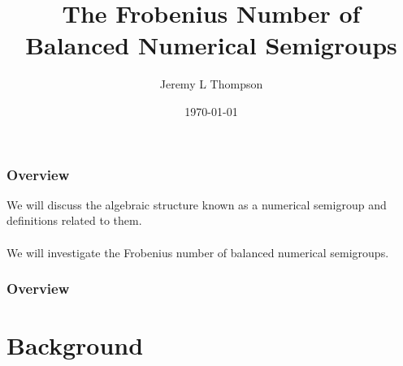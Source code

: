 \documentclass{beamer}
\title[Balanced Numerical Semigroups]{The Frobenius Number of\\ Balanced Numerical Semigroups} %
\author{Jeremy L Thompson} %
\institute[USAFA] %
{United States Air Force Academy \\ %
\medskip
\textit{jeremy.thompson@usafa.edu} %
}
\date{\today} %
\begin{document}
\begin{frame}
\titlepage %
\end{frame}


\begin{frame}
\begin{center}
\frametitle{Overview}

We will discuss the algebraic structure known as a numerical semigroup and definitions related to them.\\

~\\

We will investigate the Frobenius number of balanced numerical semigroups.

\end{center}
\end{frame}
 

\begin{frame}
\frametitle{Overview} %
\tableofcontents %
\end{frame}


\section{Background}
\end{document}

